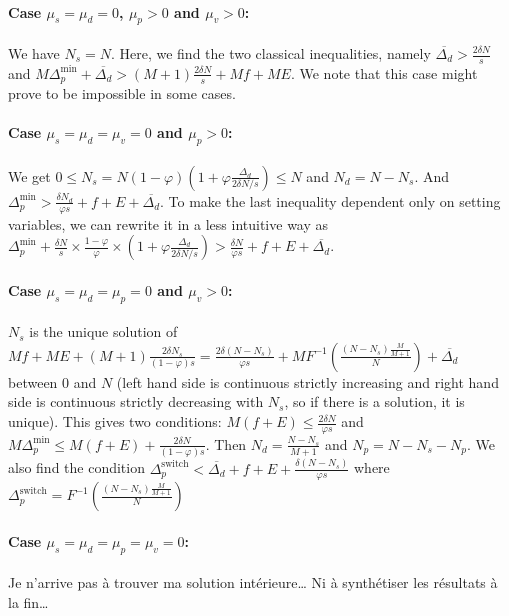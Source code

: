\documentclass[english, a4paper]{article}
\theoremstyle{plain}
\theoremstyle{definition}
\theoremstyle{remark}
\begin{document}
\paragraph{Case $\mu_s = \mu_d = 0$, $\mu_p > 0$ and $\mu_v > 0$:} We have $N_s = N$. Here, we find the two classical inequalities, namely $\overline{\Delta_d} > \frac{2\delta N}{s}$ and $M\Delta_p^{\text{min}} + \overline{\Delta_d} > (M+1)\frac{2\delta N}{s} + Mf + ME$. We note that this case might prove to be impossible in some cases.



\paragraph{Case $\mu_s = \mu_d = \mu_v = 0$ and $\mu_p > 0$:} We get $0 \leq N_s = N(1-\varphi)\left( 1 + \varphi \frac{\Delta_d}{2\delta N /s} \right) \leq N$ and $N_d = N - N_s$. And $\Delta_p^{\text{min}} > \frac{\delta N_d}{\varphi s} + f +E + \overline{\Delta_d}$. To make the last inequality dependent only on setting variables, we can rewrite it in a less intuitive way as $\Delta_p^{\text{min}} + \frac{\delta N}{s}\times \frac{1-\varphi}{\varphi}\times \left( 1 + \varphi \frac{\Delta_d}{2\delta N /s} \right) > \frac{\delta N}{\varphi s} + f +E + \overline{\Delta_d}$.

\paragraph{Case $\mu_s = \mu_d = \mu_p = 0$ and $\mu_v > 0$:} $N_s$ is the unique solution of $Mf + ME + (M+1)\frac{2\delta N_s}{(1-\varphi)s} = \frac{2\delta (N-N_s)}{\varphi s} + MF^{-1}\left( \frac{(N-N_s)\frac{M}{M+1}}{N} \right) + \overline{\Delta _d}$ between $0$ and $N$ (left hand side is continuous strictly increasing and right hand side is continuous strictly decreasing with $N_s$, so if there is a solution, it is unique). This gives two conditions: $M(f+E) \leq \frac{2\delta N}{\varphi s}$ and $M\Delta_p^{\text{min}} \leq M(f+E) + \frac{2\delta N}{(1-\varphi )s}$. Then $N_d =\frac{N-N_s}{M+1}$ and $N_p = N - N_s - N_p$. We also find the condition $\Delta_p^{\text{switch}} < \overline{\Delta_d} + f + E + \frac{\delta (N - N_s)}{\varphi s}$ where $\Delta_p^{\text{switch}} = F^{-1}\left( \frac{(N-N_s)\frac{M}{M+1}}{N} \right)$

\paragraph{Case $\mu_s = \mu_d = \mu_p = \mu_v = 0$:} Je n’arrive pas à trouver ma solution intérieure… Ni à synthétiser les résultats à la fin…
\end{document}
